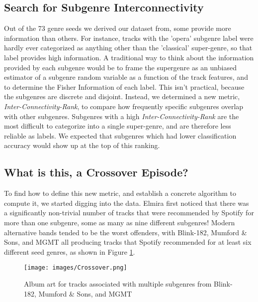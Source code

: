 \documentclass[conference]{IEEEtran}
\begin{document}
\subsection{Search for Subgenre Interconnectivity}
Out of the 73 genre seeds we derived our dataset from, some provide more information than others. For instance, tracks with the 'opera' subgenre label were hardly ever categorized as anything other than the 'classical' super-genre, so that label provides high information. A traditional way to think about the information provided by each subgenre would be to frame the supergenre as an unbiased estimator of a subgenre random variable as a function of the track features, and to determine the Fisher Information of each label. This isn't practical, because the subgenres are discrete and disjoint. Instead, we determined a new metric, \emph{Inter-Connectivity-Rank}, to compare how frequently specific subgenres overlap with other subgenres. Subgenres with a high \emph{Inter-Connectivity-Rank} are the most difficult to categorize into a single super-genre, and are therefore less reliable as labels. We expected that subgenres which had lower classification accuracy would show up at the top of this ranking.

\subsection{What is this, a Crossover Episode?}
To find how to define this new metric, and establish a concrete algorithm to compute it, we started digging into the data. Elmira first noticed that there was a significantly non-trivial number of tracks that were recommended by Spotify for more than one subgenre, some as many as nine different subgenres! Modern alternative bands tended to be the worst offenders, with Blink-182, Mumford \& Sons, and MGMT all producing tracks that Spotify recommended for at least six different seed genres, as shown in Figure \ref{fig:Crossover}.

\begin{figure}[htbp]
\centerline{\texttt{[image: images/Crossover.png]}}
\caption{Album art for tracks associated with multiple subgenres from Blink-182, Mumford \& Sons, and MGMT}
\label{fig:Crossover}
\end{figure}
\end{document}
